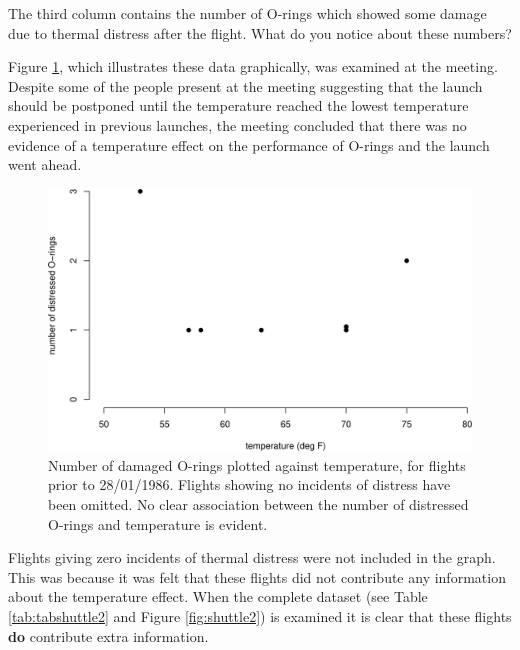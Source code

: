 \documentclass[
  british,
]{book}
\begin{document}
The third column contains the number of O-rings which showed some damage due to
thermal distress after the flight. What do you notice about these numbers?

Figure \ref{fig:shuttle1}, which illustrates these data graphically, was examined at the meeting. Despite some of the people present at the meeting suggesting that the launch should be postponed until the temperature reached the lowest temperature experienced in previous launches, the meeting concluded that there was no evidence of a temperature effect on the performance of O-rings and the launch went ahead.

\begin{figure}

{\centering \includegraphics[width=0.8\linewidth]{images/shuttle1} 

}

\caption{Number of damaged O-rings plotted against temperature, for flights prior to 28/01/1986. Flights showing no incidents of distress have been omitted.  No clear association between the number of distressed O-rings and temperature is evident.}\label{fig:shuttle1}
\end{figure}

Flights giving zero incidents of thermal distress were not included in the graph. This was because it was felt that these flights did not contribute any information about the temperature effect. When the complete dataset (see Table \ref{tab:tabshuttle2} and Figure \ref{fig:shuttle2}) is examined it is clear that these flights \textbf{do} contribute extra information.
\end{document}
